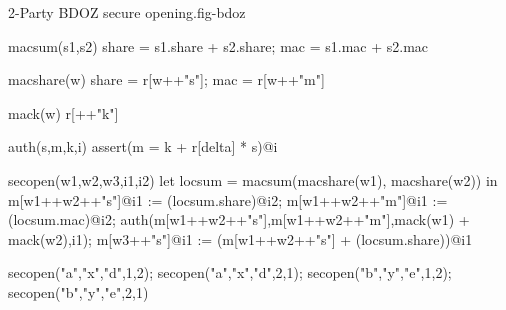 \begin{fpfig}[t]{2-Party BDOZ secure opening.}{fig-bdoz}
{\footnotesize
  \begin{verbatimtab}
    macsum(s1,s2)
    { { share = s1.share + s2.share; mac = s1.mac + s2.mac } }
    
    macshare(w) { {  share = r[w++"s"]; mac = r[w++"m"] } }

    mack(w) { r[++"k"] }
    
    auth(s,m,k,i) { assert(m = k + r[delta] * s)@i }
    
    secopen(w1,w2,w3,i1,i2)
    {
      let locsum =  macsum(macshare(w1), macshare(w2)) in
      m[w1++w2++"s"]@i1 := (locsum.share)@i2;
      m[w1++w2++"m"]@i1 := (locsum.mac)@i2;
      auth(m[w1++w2++"s"],m[w1++w2++"m"],mack(w1) + mack(w2),i1);
      m[w3++"s"]@i1 := (m[w1++w2++"s"] + (locsum.share))@i1
    }

    secopen("a","x","d",1,2);
    secopen("a","x","d",2,1);
    secopen("b","y","e",1,2);
    secopen("b","y","e",2,1) \end{verbatimtab}
}
\end{fpfig}

    
